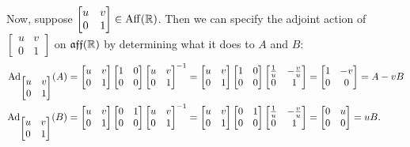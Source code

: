 \begin{example}
	Now, suppose $\begin{bmatrix} u & v \\ 0 & 1 \end{bmatrix} \in \operatorname{Aff}(\mathbb{R})$. Then we can specify the adjoint action of $\begin{bmatrix} u & v \\ 0 & 1 \end{bmatrix}$ on $\mathfrak{aff}(\mathbb{R})$ by determining what it does to $A$ and $B$:
	\begin{align*}
		\Ad_{\begin{bmatrix} u & v \\ 0 & 1 \end{bmatrix}}(A) & = \begin{bmatrix} u & v \\ 0 & 1 \end{bmatrix} \begin{bmatrix} 1 & 0 \\ 0 & 0 \end{bmatrix} \begin{bmatrix} u & v \\ 0 & 1 \end{bmatrix}^{-1} = \begin{bmatrix} u & v \\ 0 & 1 \end{bmatrix} \begin{bmatrix} 1 & 0 \\ 0 & 0 \end{bmatrix} \begin{bmatrix} \frac{1}{u} & -\frac{v}{u} \\ 0 & 1 \end{bmatrix} = \begin{bmatrix} 1 & -v \\ 0 & 0 \end{bmatrix} = A - vB \\
		\Ad_{\begin{bmatrix} u & v \\ 0 & 1 \end{bmatrix}}(B) & = \begin{bmatrix} u & v \\ 0 & 1 \end{bmatrix} \begin{bmatrix} 0 & 1 \\ 0 & 0 \end{bmatrix} \begin{bmatrix} u & v \\ 0 & 1 \end{bmatrix}^{-1} = \begin{bmatrix} u & v \\ 0 & 1 \end{bmatrix} \begin{bmatrix} 0 & 1 \\ 0 & 0 \end{bmatrix} \begin{bmatrix} \frac{1}{u} & -\frac{v}{u} \\ 0 & 1 \end{bmatrix} = \begin{bmatrix} 0 & u \\ 0 & 0 \end{bmatrix} = uB.

\end{align*}
\end{example}
